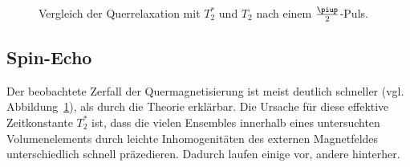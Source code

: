 \documentclass[
    11pt,
    ngerman
]{scrbook}
\begin{document}
\begin{figure}[htbp]
    \begin{minipage}[htbp]{.45\textwidth}
        \centering
        \caption{%
            Sättigungsrückgewinnung nach einem $\frac\piup2$-Puls.
    }
    \label{fig:laengs}
\end{minipage}
\hfill
\begin{minipage}[htbp]{.45\textwidth}
    \centering
    \caption{%
        Vergleich der Querrelaxation mit $T_2^*$ und $T_2$ nach einem $\frac\piup2$-Puls. 
    }
    \label{fig:quer}
\end{minipage}
\end{figure}


\subsection{Spin-Echo}

Der beobachtete Zerfall der Quermagnetisierung ist meist deutlich schneller
(vgl. Abbildung~\ref{fig:quer}), als durch die Theorie erklärbar. Die Ursache
für diese effektive Zeitkonstante $T_2^*$ ist, dass die vielen Ensembles
innerhalb eines untersuchten Volumenelements durch leichte Inhomogenitäten des
externen Magnetfeldes unterschiedlich schnell präzedieren. Dadurch laufen
einige vor, andere hinterher.
\end{document}
